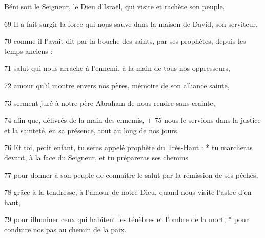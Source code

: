 Béni soit le Seigneur, le Dieu d'Israël,
qui visite et rachète son peuple.

69 Il a fait surgir la force qui nous sauve
dans la maison de David, son serviteur,

70 comme il l'avait dit par la bouche des saints,
par ses prophètes, depuis les temps anciens :

71 salut qui nous arrache à l'ennemi,
à la main de tous nos oppresseurs,

72 amour qu'il montre envers nos pères,
mémoire de son alliance sainte,

73 serment juré à notre père Abraham
   de nous rendre sans crainte,

74 afin que, délivrés de la main des ennemis, +
75 nous le servions dans la justice et la sainteté,
en sa présence, tout au long de nos jours.

76 Et toi, petit enfant, tu seras appelé
   prophète du Très-Haut : *
tu marcheras devant, à la face du Seigneur,
   et tu prépareras ses chemins

77 pour donner à son peuple de connaître le salut
par la rémission de ses péchés,

78 grâce à la tendresse, à l'amour de notre Dieu,
quand nous visite l'astre d'en haut,

79 pour illuminer ceux qui habitent les ténèbres
   et l'ombre de la mort, *
pour conduire nos pas
   au chemin de la paix.